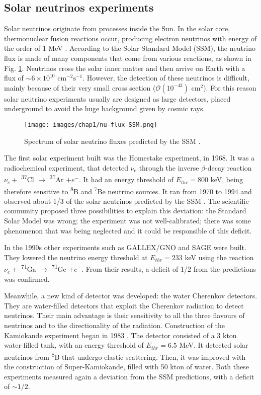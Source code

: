 \subsection{Solar neutrinos experiments}
Solar neutrinos originate from processes inside the Sun. In the solar core, thermonuclear fusion reactions occur, producing electron neutrinos with energy of the order of 1 MeV \cite{giunti_kim_fundamental}. According to the Solar Standard Model (SSM), the neutrino flux is made of many components that come from various reactions, as shown in Fig. \ref{fig:nu-flux-SSM}. Neutrinos cross the solar inner matter and then arrive on Earth with a flux of $\sim 6 \times 10^{10} \text{ cm}^{-2}\text{s}^{-1}$. However, the detection of these neutrinos is difficult, mainly because of their very small cross section ($\mathcal{O}(10^{-43}) \text{ cm}^2$). For this reason solar neutrino experiments usually are designed as large detectors, placed underground to avoid the huge background given by cosmic rays.

\begin{figure}
    \centering
    \texttt{[image: images/chap1/nu-flux-SSM.png]}
    \caption{Spectrum of solar neutrino fluxes predicted by the SSM \cite{solar_neutrino_flux}.}
    \label{fig:nu-flux-SSM}
\end{figure}

The first solar experiment built was the Homestake experiment, in 1968. It was a radiochemical experiment, that detected $\nu_e$ through the inverse $\beta$-decay reaction $\nu_e +$ \textsuperscript{37}Cl $\rightarrow$ \textsuperscript{37}Ar $+ e^-$. It had an energy threshold of $E_{thr} = 800$ keV, being therefore sensitive to \textsuperscript{8}B and \textsuperscript{7}Be neutrino sources. It ran from 1970 to 1994 and observed about 1/3 of the solar neutrinos predicted by the SSM \cite{Homestake}. 
The scientific community proposed three possibilities to explain this deviation: the Standard Solar Model was wrong; the experiment was not well-calibrated; there was some phenomenon that was being neglected and it could be responsible of this deficit.

In the 1990s other experiments such as GALLEX/GNO \cite{gallex/gno} and SAGE \cite{SAGE} were built. They lowered the neutrino energy threshold at $E_{thr} = 233$ keV using the reaction $\nu_e +$ \textsuperscript{71}Ga $\rightarrow$ \textsuperscript{71}Ge $+ e^-$. From their results, a deficit of 1/2 from the predictions was confirmed.

Meanwhile, a new kind of detector was developed: the water Cherenkov detectors. They are water-filled detectors that exploit the Cherenkov radiation to detect neutrinos. Their main advantage is their sensitivity to all the three flavours of neutrinos and to the directionality of the radiation. Construction of the Kamiokande experiment began in 1983 \cite{Kamiokande}. The detector consisted of a 3 kton water-filled tank, with an energy threshold of $E_{thr} = 6.5$ MeV. It detected solar neutrinos from \textsuperscript{8}B that undergo elastic scattering. Then, it was improved with the construction of Super-Kamiokande, filled with 50 kton of water. Both these experiments measured again a deviation from the SSM predictions, with a deficit of $\sim 1/2$.

